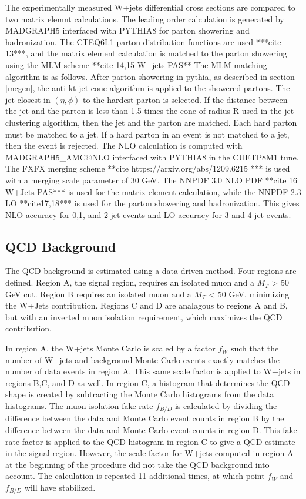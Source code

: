 \documentclass[oneside, letterpaper, oldfontcommands]{memoir}
\begin{document}
{{{\qquad The experimentally measured W+jets differential cross sections are compared to two matrix elemnt calculations. The leading order calculation is generated by MADGRAPH5 interfaced with PYTHIA8 for parton showering and hadronization. The CTEQ6L1 parton distribution functions are used ***cite 13***, and the matrix element calculation is matched to the parton showering using the MLM scheme **cite 14,15 W+jets PAS** The MLM matching algorithm is as follows. After parton showering in pythia, as described in section \ref{mcgen}, the anti-kt jet cone algorithm is applied to the showered partons. The jet closest in $(\eta, \phi)$ to the hardest parton is selected. If the distance between the jet and the parton is less than 1.5 times the cone of radius R used in the jet clustering algorithm, then the jet and the parton are matched. Each hard parton must be matched to a jet. If a hard parton in an event is not matched to a jet, then the event is rejected. The NLO calculation is computed with MADGRAPH5_AMC@NLO interfaced with PYTHIA8 in the CUETP8M1 tune. The FXFX merging scheme **cite https://arxiv.org/abs/1209.6215 *** is used with a merging scale parameter of 30 GeV. The NNPDF 3.0 NLO PDF **cite 16 W+Jets PAS*** is used for the matrix element calculation, while the NNPDF 2.3 LO **cite17,18*** is used for the parton showering and hadronization. This gives NLO accuracy for 0,1, and 2 jet events and LO accuracy for 3 and 4 jet events. 

\subsection{QCD Background}

\qquad The QCD background is estimated using a data driven method. Four regions are defined. Region A, the signal region, requires an isolated muon and a $M_{T}$ > 50 GeV cut. Region B requires an isolated muon and a $M_{T}$ < 50 GeV, minimizing the W+Jets contribution. Regions C and D are analagous to regions A and B, but with an inverted muon isolation requirement, which maximizes the QCD contribution.

\qquad In region A, the W+jets Monte Carlo is scaled by a factor $f_{W}$ such that the number of W+jets and background Monte Carlo events exactly matches the number of data events in region A. This same scale factor is applied to W+jets in regions B,C, and D as well.
\qquad In region C, a histogram that determines the QCD shape is created by subtracting the Monte Carlo histograms from the data histograms.
\qquad The muon isolation fake rate $f_{B/D}$ is calculated by dividing the difference between the data and Monte Carlo event counts in region B by the difference between the data and Monte Carlo event counts in region D. This fake rate factor is applied to the QCD histogram in region C to give a QCD estimate in the signal region. 
\qquad However, the scale factor for W+jets computed in region A at the beginning of the procedure did not take the QCD background into account. The calculation is repeated 11 additional times, at which point $f_{W}$ and $f_{B/D}$ will have stabilized.
 
}}}
\end{document}
